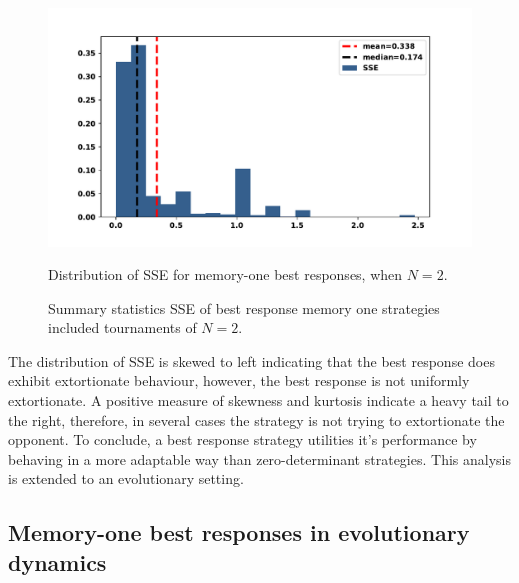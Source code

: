 \documentclass[10pt]{article}
\begin{document}
\begin{figure}[!htbp]
    \begin{minipage}{0.72\textwidth}
            \begin{center}
                \includegraphics[width=\linewidth]{img/best_respones_sserror.pdf}
            \end{center}
                \caption{Distribution of SSE for memory-one best responses, when \(N=2\).}
                \label{fig:sserror_mem_one}
    \end{minipage}\hspace{1cm}
    \begin{minipage}{0.21\textwidth}
        \centering
        \captionsetup{type=table}
        \resizebox{.85\columnwidth}{!}{%
            }
            \caption{Summary statistics SSE of best response memory one strategies included
            tournaments of \(N=2\).}
            \label{table:sserror_stats}
      \end{minipage}
\end{figure}

The distribution of SSE is skewed to left indicating that the best response does
exhibit extortionate behaviour, however, the best response is not uniformly
extortionate. A positive measure of skewness and kurtosis indicate a heavy tail
to the right, therefore, in several cases the strategy is not trying to
extortionate the opponent. To conclude, a best response strategy utilities it's
performance by behaving in a more adaptable way than zero-determinant
strategies. This analysis is extended to an evolutionary setting.

\subsection{Memory-one best responses in evolutionary dynamics}\label{subsection:best_respnse_evolutionary_setting}
\end{document}
